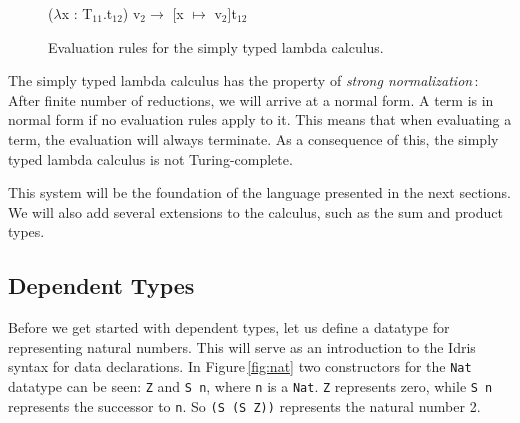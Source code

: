 \begin{center}
\begin{figure}

\begin{prooftree}
\end{prooftree}

\begin{prooftree}
\end{prooftree}

\begin{center}
($\lambda$x : T$_{11}$.t$_{12}$) v$_{2} \longrightarrow$ [x $\mapsto$ v$_{2}$]t$_{12}$ 
\end{center}

\caption{Evaluation rules for the simply typed lambda calculus.}
\label{fig:simple-evaluation-rules}

\end{figure}
\end{center}

The simply typed lambda calculus has the property of \emph{strong normalization}\,\cite[pp. 149]{Pierce:TypeSystems}: After finite number of reductions, we will arrive at a normal form. A term is in normal form if no evaluation rules apply to it. This means that when evaluating a term, the evaluation will always terminate. As a consequence of this, the simply typed lambda calculus is not Turing-complete.

This system will be the foundation of the language presented in the next sections. We will also add several extensions to the calculus, such as the sum and product types.

\subsection{Dependent Types}
\label{sec:dependent-types-idris}
Before we get started with dependent types, let us define a datatype for representing natural numbers. This will serve as an introduction to the Idris syntax for data declarations. In Figure\,\ref{fig:nat} two constructors for the \texttt{Nat} datatype can be seen: \texttt{Z} and \texttt{S n}, where \texttt{n} is a \texttt{Nat}. \texttt{Z} represents zero, while \texttt{S n} represents the successor to \texttt{n}. So \texttt{(S (S Z))} represents the natural number 2.

